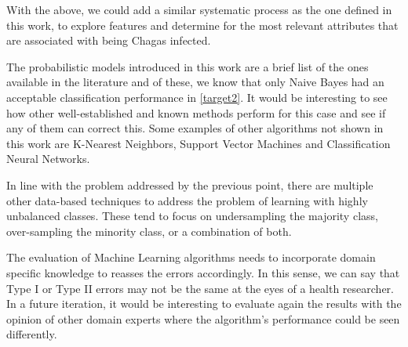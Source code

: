 \begin{description}
    \item With the above, we could add a similar systematic process as the one defined in this work, to explore features and determine for the most relevant attributes that are associated with being Chagas infected.

    \item [Test other classifiers] The probabilistic models introduced in this work are a brief list of the ones available in the literature and of these, we know that only Naive Bayes had an acceptable classification performance in \cref{target2}.
    It would be interesting to see how other well-established and known methods perform for this case and see if any of them can correct this.
    Some examples of other algorithms not shown in this work are K-Nearest Neighbors, Support Vector Machines and Classification Neural Networks.

    \item [Test other pre-processing techniques] In line with the problem addressed by the previous point, there are multiple other data-based techniques to address the problem of learning with highly unbalanced classes.
    These tend to focus on undersampling the majority class, over-sampling the minority class, or a combination of both.


    \item [Domain Evaluation] The evaluation of Machine Learning algorithms needs to incorporate domain specific knowledge to reasses the errors accordingly. In this sense, we can say that Type I or Type II errors may not be the same at the eyes of a health researcher.
    In a future iteration, it would be interesting to evaluate again the results with the opinion of other domain experts where the algorithm's performance could be seen differently.

\end{description}

